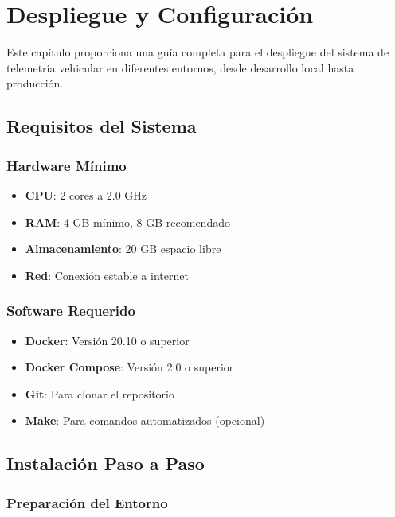 \chapter{Despliegue y Configuración}
\label{chap:despliegue}

Este capítulo proporciona una guía completa para el despliegue del sistema de telemetría vehicular en diferentes entornos, desde desarrollo local hasta producción.

\section{Requisitos del Sistema}

\subsection{Hardware Mínimo}

\begin{itemize}[noitemsep]
    \item \textbf{CPU}: 2 cores a 2.0 GHz
    \item \textbf{RAM}: 4 GB mínimo, 8 GB recomendado
    \item \textbf{Almacenamiento}: 20 GB espacio libre
    \item \textbf{Red}: Conexión estable a internet
\end{itemize}

\subsection{Software Requerido}

\begin{itemize}[noitemsep]
    \item \textbf{Docker}: Versión 20.10 o superior
    \item \textbf{Docker Compose}: Versión 2.0 o superior
    \item \textbf{Git}: Para clonar el repositorio
    \item \textbf{Make}: Para comandos automatizados (opcional)
\end{itemize}

\section{Instalación Paso a Paso}

\subsection{Preparación del Entorno}

